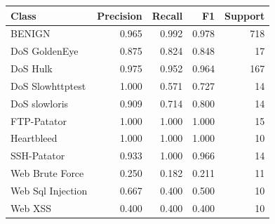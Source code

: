 \begin{tabular}{lrrrr}
\toprule
Class & Precision & Recall & F1 & Support \\
\midrule
BENIGN & 0.965 & 0.992 & 0.978 & 718 \\
DoS GoldenEye & 0.875 & 0.824 & 0.848 & 17 \\
DoS Hulk & 0.975 & 0.952 & 0.964 & 167 \\
DoS Slowhttptest & 1.000 & 0.571 & 0.727 & 14 \\
DoS slowloris & 0.909 & 0.714 & 0.800 & 14 \\
FTP-Patator & 1.000 & 1.000 & 1.000 & 15 \\
Heartbleed & 1.000 & 1.000 & 1.000 & 10 \\
SSH-Patator & 0.933 & 1.000 & 0.966 & 14 \\
Web Brute Force & 0.250 & 0.182 & 0.211 & 11 \\
Web Sql Injection & 0.667 & 0.400 & 0.500 & 10 \\
Web XSS & 0.400 & 0.400 & 0.400 & 10 \\
\bottomrule
\end{tabular}
